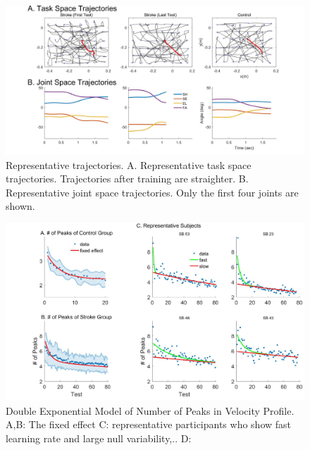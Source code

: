 \begin{figure}
	\centering
	\includegraphics[width=1\linewidth]{figures/2strokeTrajExamp}
	\caption[Example trajectories]
	{Representative trajectories. 
		A. Representative task space trajectories. Trajectories after training are straighter.
		B. Representative joint space trajectories. Only the first four joints are shown.}
	\label{fig:2stroketrajexamp}
\end{figure}


\begin{figure}
	\centering
	\includegraphics[width=1\linewidth]{figures/3nopFixRan}
	\caption[Double Exponential Model]
	{Double Exponential Model of Number of Peaks in Velocity Profile. 
		A,B: The fixed effect
		C: representative participants who show fast learning rate and large null variability,..
		D: }
	\label{fig:3nopfixran}
\end{figure}

